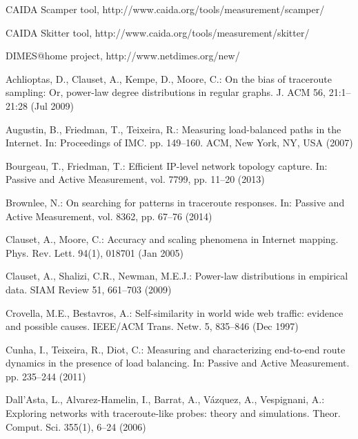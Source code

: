 \documentclass[a4paper]{llncs}
\begin{document}
\begin{thebibliography}{10}
\providecommand{\url}[1]{\texttt{#1}}
\providecommand{\urlprefix}{URL }

\uppercase{CAIDA} \uppercase{S}camper tool,
  http://www.caida.org/tools/measurement/scamper/

\uppercase{CAIDA} \uppercase{S}kitter tool,
  http://www.caida.org/tools/measurement/skitter/

\uppercase{DIMES}@home project, http://www.netdimes.org/new/

Achlioptas, D., Clauset, A., Kempe, D., Moore, C.: On the bias of traceroute
  sampling: Or, power-law degree distributions in regular graphs. J. ACM  56,
  21:1--21:28 (Jul 2009)

Augustin, B., Friedman, T., Teixeira, R.: Measuring load-balanced paths in the
  \uppercase{i}nternet. In: Proceedings of IMC. pp. 149--160. ACM, New York,
  NY, USA (2007)

Bourgeau, T., Friedman, T.: Efficient \uppercase{IP}-level network topology
  capture. In: Passive and Active Measurement, vol. 7799, pp. 11--20 (2013)

Brownlee, N.: On searching for patterns in traceroute responses. In: Passive
  and Active Measurement, vol. 8362, pp. 67--76 (2014)

Clauset, A., Moore, C.: Accuracy and scaling phenomena in \uppercase{I}nternet
  mapping. Phys. Rev. Lett.  94(1),  018701 (Jan 2005)

Clauset, A., Shalizi, C.R., Newman, M.E.J.: Power-law distributions in
  empirical data. SIAM Review  51,  661--703 (2009)

Crovella, M.E., Bestavros, A.: Self-similarity in world wide web traffic:
  evidence and possible causes. IEEE/ACM Trans. Netw.  5,  835--846 (Dec 1997)

Cunha, I., Teixeira, R., Diot, C.: Measuring and characterizing end-to-end
  route dynamics in the presence of load balancing. In: Passive and Active
  Measurement. pp. 235--244 (2011)

Dall'Asta, L., Alvarez-Hamelin, I., Barrat, A., V\'{a}zquez, A., Vespignani,
  A.: Exploring networks with traceroute-like probes: theory and simulations.
  Theor. Comput. Sci.  355(1),  6--24 (2006)


\end{thebibliography}
\end{document}
